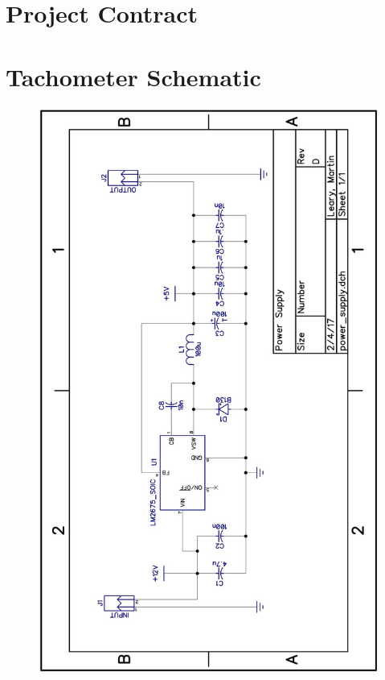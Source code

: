 \documentclass[11pt]{article}
\begin{document}
\appendix
\renewcommand\pagenumbering[1]{}
\section{Project Contract}
\label{app:contract}



\section{Tachometer Schematic}
\label{app:schem}
\begin{figure}[H]
    \centering
    \includegraphics[width=.8\textwidth]{documents/ps_schem}
\end{figure}
\end{document}

